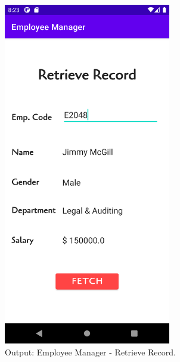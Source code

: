 \documentclass[12pt, a4]{article}
\begin{document}
\subsection*{}
\begin{figure}[h]
\centering
\caption{Output: Employee Manager - Retrieve Record.}
\includegraphics[height=15cm, width=7.3cm]{EmployeeManager/Screenshots/Output-5.png}
\end{figure}

\newpage
\end{document}
